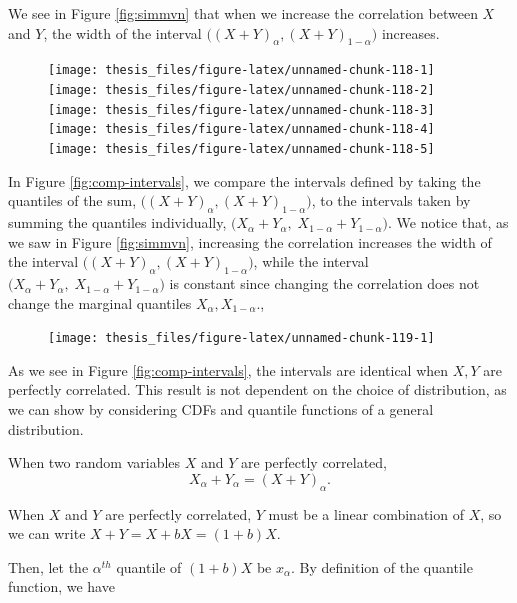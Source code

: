 \documentclass[12pt,twoside]{smiththesis}
\begin{document}
We see in Figure \ref{fig:simmvn} that when we increase the correlation between \(X\) and \(Y\), the width of the interval \(\Big((X+Y)_\alpha, (X+Y)_{1-\alpha}\Big)\) increases.
\begin{figure}

{\centering \texttt{[image: thesis\_files/figure-latex/unnamed-chunk-118-1]} \texttt{[image: thesis\_files/figure-latex/unnamed-chunk-118-2]} \texttt{[image: thesis\_files/figure-latex/unnamed-chunk-118-3]} \texttt{[image: thesis\_files/figure-latex/unnamed-chunk-118-4]} \texttt{[image: thesis\_files/figure-latex/unnamed-chunk-118-5]} 

}

\caption{\label{fig:simmvn}}\label{fig:unnamed-chunk-118}
\end{figure}
In Figure \ref{fig:comp-intervals}, we compare the intervals defined by taking the quantiles of the sum, \(\Big((X+Y)_\alpha, (X+Y)_{1-\alpha}\Big)\), to the intervals taken by summing the quantiles individually, \(\Big(X_\alpha +Y_\alpha, \; X_{1-\alpha} +Y_{1-\alpha}\Big)\). We notice that, as we saw in Figure \ref{fig:simmvn}, increasing the correlation increases the width of the interval \(\Big((X+Y)_\alpha, (X+Y)_{1-\alpha}\Big)\), while the interval \(\Big(X_\alpha +Y_\alpha, \; X_{1-\alpha} +Y_{1-\alpha}\Big)\) is constant since changing the correlation does not change the marginal quantiles \(X_\alpha, X_{1-\alpha}\).,
\begin{figure}

{\centering \texttt{[image: thesis\_files/figure-latex/unnamed-chunk-119-1]} 

}

\caption{\label{fig:comp-intervals}}\label{fig:unnamed-chunk-119}
\end{figure}
As we see in Figure \ref{fig:comp-intervals}, the intervals are identical when \(X,Y\) are perfectly correlated. This result is not dependent on the choice of distribution, as we can show by considering CDFs and quantile functions of a general distribution.
\begin{tcolorbox}[title = Quantiles of the Sum of Perfectly Correlated Random Variables]
When two random variables $X$ and $Y$ are perfectly correlated,
$$X_\alpha + Y_\alpha = (X+Y)_\alpha.$$
\end{tcolorbox}
When \(X\) and \(Y\) are perfectly correlated, \(Y\) must be a linear combination of \(X\), so we can write \(X+Y= X+bX=(1+b)X\).

Then, let the \(\alpha^{th}\) quantile of \((1+b)X\) be \(x_\alpha\). By definition of the quantile function, we have
\end{document}
